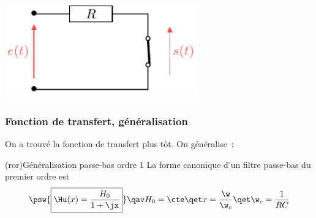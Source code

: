\documentclass[../../main/main.tex]{subfiles}
\begin{document}
\begin{isd}[sidebyside align=top]
\begin{center}
{		}{%
			\includegraphics[height=4cm]{filtre_rc-hf}
		}%
		\vspace{-15pt}
	\end{center}
	\vspace{-15pt}
	\vspace{-15pt}
\end{isd}

\subsubsection{Fonction de transfert, généralisation}
On a trouvé la fonction de transfert plus tôt. On généralise~:
\begin{tcb}(ror){Généralisation passe-bas ordre 1}
	La forme canonique d'un filtre passe-bas du premier ordre est
	\[
		\psw{%
			\boxed{\Hu(x) = \frac{H_0}{1+\jx}}
		}%
		\qav
		H_0 = \cte
		\qet
		x = \frac{\w}{\w_c}
		\qet
		\w_c = \frac{1}{RC}
	\]
	\vspace{-15pt}
\end{tcb}
\end{document}
